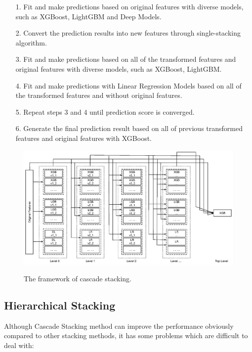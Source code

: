 \documentclass[12pt]{article}
\begin{document}
\begin{itemize}
\label{alg:cascade-stacking}
\item[1.] Fit and make predictions based on original features with diverse models, such as XGBoost, LightGBM and Deep Models.
\item[2.] Convert the prediction results into new features through single-stacking algorithm.
\item[3.] Fit and make predictions based on all of the transformed features and original features with diverse models, such as XGBoost, LightGBM.
\item[4.] Fit and make predictions with Linear Regression Models based on all of the transformed features and without original features.
\item[5.] Repeat steps 3 and 4 until prediction score is converged.
\item[6.] Generate the final prediction result based on all of previous transformed features and original features with XGBoost.
\end{itemize}


\begin{figure}[ht]
  \centering
  \includegraphics[width=1.0\textwidth]{../img/cascade-stacking}\\
  \caption{The framework of cascade stacking.}
  \label{fig:cascade-stacking}
\end{figure}

\subsection{Hierarchical Stacking}

Although Cascade Stacking method can improve the performance obviously compared to other stacking methods, it has some problems which are difficult to deal with:
\end{document}
